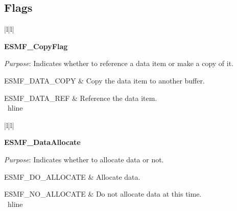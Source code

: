 
\subsection{Flags}


\begin{tabular}{|l|l|}
\hline

{\bf ESMF\_CopyFlag} \\ \hline

{{\it Purpose}:  
Indicates whether to reference a data item or make a copy of it.} \\ \hline

ESMF\_DATA\_COPY & Copy the data item to another buffer. \\ \hline

ESMF\_DATA\_REF & Reference the data item. \\ \ hline
\end{tabular}


\begin{tabular}{|l|l|}
\hline

{\bf ESMF\_DataAllocate} \\ \hline

{{\it Purpose}:  
Indicates whether to allocate data or not.} \\ \hline

ESMF\_DO\_ALLOCATE & Allocate data. \\ \hline

ESMF\_NO\_ALLOCATE & Do not allocate data at this time. \\ \ hline
\end{tabular}

